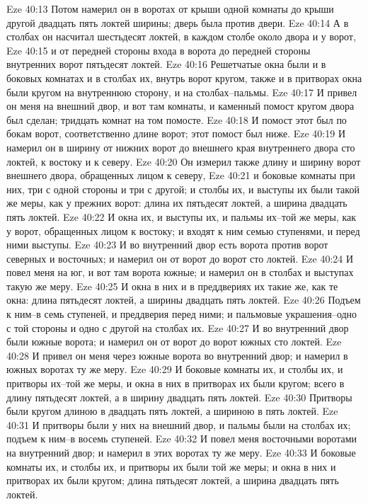 Eze 40:13  Потом намерил он в воротах от крыши одной комнаты до крыши другой двадцать пять локтей ширины; дверь была против двери.
Eze 40:14  А в столбах он насчитал шестьдесят локтей, в каждом столбе около двора и у ворот,
Eze 40:15  и от передней стороны входа в ворота до передней стороны внутренних ворот пятьдесят локтей.
Eze 40:16  Решетчатые окна были и в боковых комнатах и в столбах их, внутрь ворот кругом, также и в притворах окна были кругом на внутреннюю сторону, и на столбах--пальмы.
Eze 40:17  И привел он меня на внешний двор, и вот там комнаты, и каменный помост кругом двора был сделан; тридцать комнат на том помосте.
Eze 40:18  И помост этот был по бокам ворот, соответственно длине ворот; этот помост был ниже.
Eze 40:19  И намерил он в ширину от нижних ворот до внешнего края внутреннего двора сто локтей, к востоку и к северу.
Eze 40:20  Он измерил также длину и ширину ворот внешнего двора, обращенных лицом к северу,
Eze 40:21  и боковые комнаты при них, три с одной стороны и три с другой; и столбы их, и выступы их были такой же меры, как у прежних ворот: длина их пятьдесят локтей, а ширина двадцать пять локтей.
Eze 40:22  И окна их, и выступы их, и пальмы их--той же меры, как у ворот, обращенных лицом к востоку; и входят к ним семью ступенями, и перед ними выступы.
Eze 40:23  И во внутренний двор есть ворота против ворот северных и восточных; и намерил он от ворот до ворот сто локтей.
Eze 40:24  И повел меня на юг, и вот там ворота южные; и намерил он в столбах и выступах такую же меру.
Eze 40:25  И окна в них и в преддвериях их такие же, как те окна: длина пятьдесят локтей, а ширины двадцать пять локтей.
Eze 40:26  Подъем к ним--в семь ступеней, и преддверия перед ними; и пальмовые украшения--одно с той стороны и одно с другой на столбах их.
Eze 40:27  И во внутренний двор были южные ворота; и намерил он от ворот до ворот южных сто локтей.
Eze 40:28  И привел он меня через южные ворота во внутренний двор; и намерил в южных воротах ту же меру.
Eze 40:29  И боковые комнаты их, и столбы их, и притворы их--той же меры, и окна в них в притворах их были кругом; всего в длину пятьдесят локтей, а в ширину двадцать пять локтей.
Eze 40:30  Притворы были кругом длиною в двадцать пять локтей, а шириною в пять локтей.
Eze 40:31  И притворы были у них на внешний двор, и пальмы были на столбах их; подъем к ним--в восемь ступеней.
Eze 40:32  И повел меня восточными воротами на внутренний двор; и намерил в этих воротах ту же меру.
Eze 40:33  И боковые комнаты их, и столбы их, и притворы их были той же меры; и окна в них и притворах их были кругом; длина пятьдесят локтей, а ширина двадцать пять локтей.
